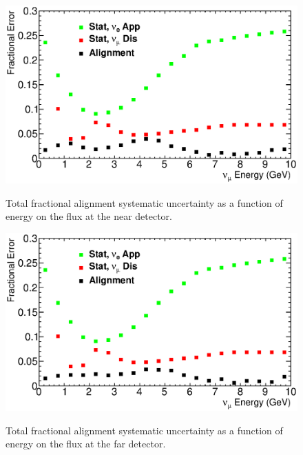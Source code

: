 {\begin{figure}[ht]
  \begin{center}
    {\includegraphics[width=6.0in]{figures/tot_error_near.eps}}
  \end{center}
\caption{ Total fractional alignment systematic uncertainty as a function of energy on the flux at the near detector. }
\end{figure}

\begin{figure}[ht]
  \begin{center}
    {\includegraphics[width=6.0in]{figures/tot_error_far.eps}}
  \end{center}
\caption{ Total fractional alignment systematic uncertainty as a function of energy on the flux at the far detector. }
\end{figure}

}
